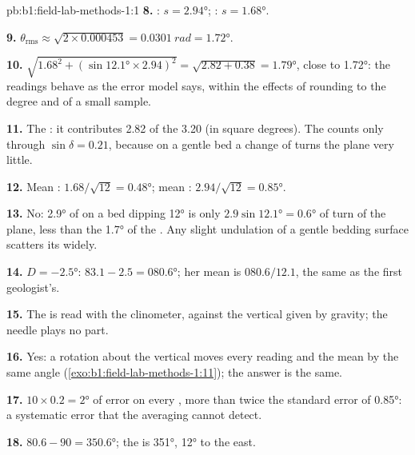 \begin{solution}{pb:b1:field-lab-methods-1:1}
\textbf{8.} : $s = \ang{2.94}$; : $s = \ang{1.68}$.

\textbf{9.} $\theta_{\text{rms}} \approx \sqrt{2\times0.000453} =
\qty{0.0301}{rad} = \ang{1.72}$.

\textbf{10.} $\sqrt{1.68^2 + (\sin\ang{12.1}\times2.94)^2} = \sqrt{2.82 +
0.38} = \ang{1.79}$, close to \ang{1.72}: the readings behave as the error
model says, within the effects of rounding to the degree and of a small
sample.

\textbf{11.} The : it contributes 2.82 of the 3.20 (in square degrees).
The  counts only through $\sin\delta = 0.21$, because on a gentle
bed a change of  turns the plane very little.

\textbf{12.} Mean : $1.68/\sqrt{12} = \ang{0.48}$; mean :
$2.94/\sqrt{12} = \ang{0.85}$.

\textbf{13.} No: \ang{2.9} of  on a bed dipping \ang{12} is only
$2.9\sin\ang{12.1} = \ang{0.6}$ of turn of the plane, less than the
\ang{1.7} of the . Any slight undulation of a gentle bedding surface
scatters its  widely.

\textbf{14.} $D = \ang{-2.5}$: $83.1 - 2.5 = \ang{080.6}$; her mean is
$080.6/12.1$, the same as the first geologist's.

\textbf{15.} The  is read with the clinometer, against the vertical given
by gravity; the needle plays no part.

\textbf{16.} Yes: a rotation about the vertical moves every reading and the
mean by the same angle (\cref{exo:b1:field-lab-methods-1:11}); the answer is the same.

\textbf{17.} $10\times0.2 = \ang{2}$ of error on every , more
than twice the standard error of \ang{0.85}: a systematic error that the
averaging cannot detect.

\textbf{18.} $80.6 - 90 = \ang{350.6}$; the  is  \ang{351},
 \ang{12} to the east.


\end{solution}
